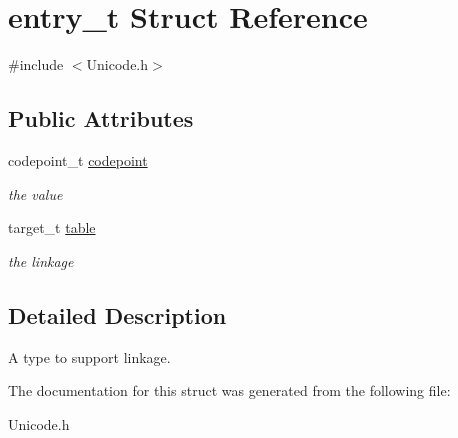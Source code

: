 \hypertarget{structentry__t}{}\section{entry\+\_\+t Struct Reference}
\label{structentry__t}


{\ttfamily \#include $<$Unicode.\+h$>$}

\subsection*{Public Attributes}
\begin{DoxyCompactItemize}
\item 
codepoint\+\_\+t \hyperlink{structentry__t_a1e82af966dbc9caa8129a7b4320417bc}{codepoint}\hypertarget{structentry__t_a1e82af966dbc9caa8129a7b4320417bc}{}\label{structentry__t_a1e82af966dbc9caa8129a7b4320417bc}

\begin{DoxyCompactList}\small\item\em the value \end{DoxyCompactList}\item 
target\+\_\+t \hyperlink{structentry__t_aee9f08e356b624555bb6101ea4633f3a}{table}\hypertarget{structentry__t_aee9f08e356b624555bb6101ea4633f3a}{}\label{structentry__t_aee9f08e356b624555bb6101ea4633f3a}

\begin{DoxyCompactList}\small\item\em the linkage \end{DoxyCompactList}\end{DoxyCompactItemize}


\subsection{Detailed Description}
A type to support linkage. 

The documentation for this struct was generated from the following file\+:\begin{DoxyCompactItemize}
\item 
Unicode.\+h\end{DoxyCompactItemize}
